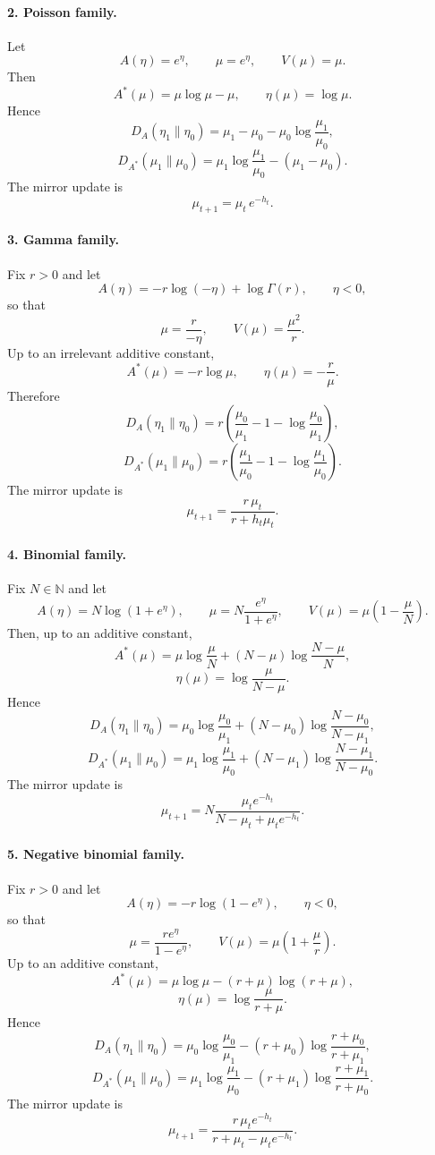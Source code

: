 \documentclass[11pt]{article}
\begin{document}
\paragraph{2. Poisson family.}
Let
\[
A(\eta)=e^\eta,
\qquad
\mu=e^\eta,
\qquad
V(\mu)=\mu.
\]
Then
\[
A^\ast(\mu)=\mu\log\mu-\mu,
\qquad
\eta(\mu)=\log\mu.
\]
Hence
\[
D_A(\eta_1\|\eta_0)
=
\mu_1-\mu_0-\mu_0\log\frac{\mu_1}{\mu_0},
\]
\[
D_{A^\ast}(\mu_1\|\mu_0)
=
\mu_1\log\frac{\mu_1}{\mu_0}-(\mu_1-\mu_0).
\]
The mirror update is
\[
\mu_{t+1}=\mu_t\,e^{-h_t}.
\]

\paragraph{3. Gamma family.}
Fix \(r>0\) and let
\[
A(\eta)=-r\log(-\eta)+\log\Gamma(r),
\qquad
\eta<0,
\]
so that
\[
\mu=\frac{r}{-\eta},
\qquad
V(\mu)=\frac{\mu^2}{r}.
\]
Up to an irrelevant additive constant,
\[
A^\ast(\mu)=-r\log\mu,
\qquad
\eta(\mu)=-\frac{r}{\mu}.
\]
Therefore
\[
D_A(\eta_1\|\eta_0)
=
r\left(\frac{\mu_0}{\mu_1}-1-\log\frac{\mu_0}{\mu_1}\right),
\]
\[
D_{A^\ast}(\mu_1\|\mu_0)
=
r\left(\frac{\mu_1}{\mu_0}-1-\log\frac{\mu_1}{\mu_0}\right).
\]
The mirror update is
\[
\mu_{t+1}
=
\frac{r\,\mu_t}{r+h_t\mu_t}.
\]

\paragraph{4. Binomial family.}
Fix \(N\in\mathbb N\) and let
\[
A(\eta)=N\log(1+e^\eta),
\qquad
\mu=N\frac{e^\eta}{1+e^\eta},
\qquad
V(\mu)=\mu\left(1-\frac{\mu}{N}\right).
\]
Then, up to an additive constant,
\[
A^\ast(\mu)
=
\mu\log\frac{\mu}{N}+(N-\mu)\log\frac{N-\mu}{N},
\]
\[
\eta(\mu)=\log\frac{\mu}{N-\mu}.
\]
Hence
\[
D_A(\eta_1\|\eta_0)
=
\mu_0\log\frac{\mu_0}{\mu_1}
+
(N-\mu_0)\log\frac{N-\mu_0}{N-\mu_1},
\]
\[
D_{A^\ast}(\mu_1\|\mu_0)
=
\mu_1\log\frac{\mu_1}{\mu_0}
+
(N-\mu_1)\log\frac{N-\mu_1}{N-\mu_0}.
\]
The mirror update is
\[
\mu_{t+1}
=
N\frac{\mu_t e^{-h_t}}{N-\mu_t+\mu_t e^{-h_t}}.
\]

\paragraph{5. Negative binomial family.}
Fix \(r>0\) and let
\[
A(\eta)=-r\log(1-e^\eta),
\qquad
\eta<0,
\]
so that
\[
\mu=\frac{r e^\eta}{1-e^\eta},
\qquad
V(\mu)=\mu\left(1+\frac{\mu}{r}\right).
\]
Up to an additive constant,
\[
A^\ast(\mu)
=
\mu\log\mu-(r+\mu)\log(r+\mu),
\]
\[
\eta(\mu)=\log\frac{\mu}{r+\mu}.
\]
Hence
\[
D_A(\eta_1\|\eta_0)
=
\mu_0\log\frac{\mu_0}{\mu_1}
-(r+\mu_0)\log\frac{r+\mu_0}{r+\mu_1},
\]
\[
D_{A^\ast}(\mu_1\|\mu_0)
=
\mu_1\log\frac{\mu_1}{\mu_0}
-(r+\mu_1)\log\frac{r+\mu_1}{r+\mu_0}.
\]
The mirror update is
\[
\mu_{t+1}
=
\frac{r\,\mu_t e^{-h_t}}{r+\mu_t-\mu_t e^{-h_t}}.
\]
\end{document}
